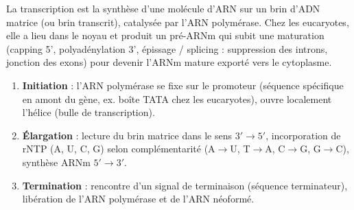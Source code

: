 \documentclass[11pt]{article}
\newcommand{\cle}[1]{{\popxbold\color{popdark}#1}}
\begin{document}
\begin{definition}[Transcription]
La \cle{transcription} est la synthèse d'une molécule d'ARN sur un brin d'ADN matrice (ou brin transcrit), catalysée par l'\cle{ARN polymérase}. Chez les eucaryotes, elle a lieu dans le \cle{noyau} et produit un \cle{pré-ARNm} qui subit une \cle{maturation} (capping 5', polyadénylation 3', \cle{épissage} / \cle{splicing} : suppression des \cle{introns}, jonction des \cle{exons}) pour devenir l'ARNm mature exporté vers le cytoplasme.
\end{definition}

\begin{propriete}
\begin{enumerate}
\item \textbf{Initiation} : l'ARN polymérase se fixe sur le \cle{promoteur} (séquence spécifique en amont du gène, ex. boîte TATA chez les eucaryotes), ouvre localement l'hélice (bulle de transcription).
\item \textbf{Élargation} : lecture du brin matrice dans le sens $3' \rightarrow 5'$, incorporation de rNTP (A, U, C, G) selon complémentarité (A$\rightarrow$U, T$\rightarrow$A, C$\rightarrow$G, G$\rightarrow$C), synthèse ARNm $5' \rightarrow 3'$.
\item \textbf{Termination} : rencontre d'un signal de terminaison (séquence terminateur), libération de l'ARN polymérase et de l'ARN néoformé.
\end{enumerate}
\end{propriete}
\end{document}
